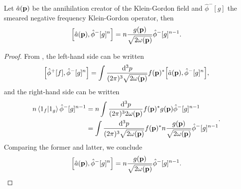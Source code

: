 \begin{lemma}\label{thm:qkg_comm_annihilation_smeared_pos_kg}
	Let $\hat{a}(\vb{p})$ be the annihilation creator of the Klein-Gordon field and $\hat\phi^-[g]$ the smeared negative frequency Klein-Gordon operator, then
	\begin{equation}\label{eq:qkg_comm_annihilation_smeared_pos_kg}
		\comm{\hat{a}(\vb{p})}{\hat\phi^-[g]^n}		
		=
		n
		\frac{g(\vb{p})}{\sqrt{2\omega(\vb{p})}}
		\hat\phi^-[g]^{n-1}
		.
	\end{equation}
\end{lemma}
\begin{proof}
	From , the left-hand side can be written
	\begin{equation*}
		\comm{\hat\phi^+[f]}{\hat\phi^-[g]^n}
		=
		\int\frac{\dd[3]{p}}{(2\pi)^3\sqrt{2\omega(\vb{p})}}
		f(\vb{p})^*
		\comm{\hat{a}(\vb{p})}{\hat\phi^-[g]^n}
		,
	\end{equation*}
	and the right-hand side can be written
	\begin{equation*}
		\begin{split}
			n
			\braket{1_f}{1_g}
			\hat\phi^-[g]^{n-1}
			&=
			n
			\int\frac{\dd[3]{p}}{(2\pi)^32\omega(\vb{p})}
			f(\vb{p})^*
			g(\vb{p})
			\hat\phi^-[g]^{n-1}
			\\
			&=
			\int\frac{\dd[3]{p}}{(2\pi)^3\sqrt{2\omega(\vb{p})}}
			f(\vb{p})^*
			n
			\frac{g(\vb{p})}{\sqrt{2\omega(\vb{p})}}
			\hat\phi^-[g]^{n-1}
		\end{split}
		.
	\end{equation*}
	Comparing the former and latter, we conclude
	\begin{equation*}
		\comm{\hat{a}(\vb{p})}{\hat\phi^-[g]^n}		
		=
		n
		\frac{g(\vb{p})}{\sqrt{2\omega(\vb{p})}}
		\hat\phi^-[g]^{n-1}
		.
	\end{equation*}
\end{proof}
\qkgnumbereigenstate
